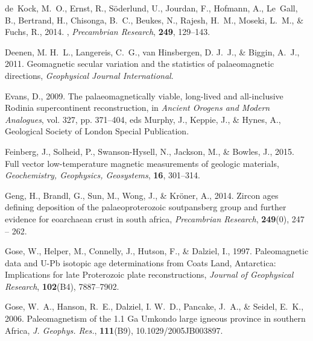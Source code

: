 \documentclass[11pt,letterpaper]{article}
\begin{document}
\begin{thebibliography}{49}
de~Kock, M.~O., Ernst, R., S{\"o}derlund, U., Jourdan, F., Hofmann, A.,
  Le~Gall, B., Bertrand, H., Chisonga, B.~C., Beukes, N., Rajesh, H.~M.,
  Moseki, L.~M., \& Fuchs, R., 2014.
, {\it Precambrian Research\/}, {\bf 249}, 129--143.

Deenen, M. H.~L., Langereis, C.~G., van Hinsbergen, D. J.~J., \& Biggin, A.~J.,
  2011.
\newblock Geomagnetic secular variation and the statistics of palaeomagnetic
  directions, {\it Geophysical Journal International\/}.

Evans, D., 2009.
\newblock The palaeomagnetically viable, long-lived and all-inclusive {R}odinia
  supercontinent reconstruction, in {\em Ancient Orogens and Modern
  Analogues\/}, vol. 327, pp. 371--404, eds Murphy, J., Keppie, J., \& Hynes,
  A., Geological Society of London Special Publication.

Feinberg, J., Solheid, P., Swanson-Hysell, N., Jackson, M., \& Bowles, J.,
  2015.
\newblock Full vector low-temperature magnetic measurements of geologic
  materials, {\it Geochemistry, Geophysics, Geosystems\/}, {\bf 16}, 301--314.

Geng, H., Brandl, G., Sun, M., Wong, J., \& Kr{\"o}ner, A., 2014.
\newblock Zircon ages defining deposition of the palaeoproterozoic soutpansberg
  group and further evidence for eoarchaean crust in south africa, {\it
  Precambrian Research\/}, {\bf 249}(0), 247 -- 262.

Gose, W., Helper, M., Connelly, J., Hutson, F., \& Dalziel, I., 1997.
\newblock Paleomagnetic data and {U-Pb} isotopic age determinations from
  {C}oats {L}and, {A}ntarctica: {I}mplications for late {P}roterozoic plate
  reconstructions, {\it Journal of Geophysical Research\/}, {\bf 102}(B4),
  7887--7902.

Gose, W.~A., Hanson, R.~E., Dalziel, I. W.~D., Pancake, J.~A., \& Seidel,
  E.~K., 2006.
\newblock Paleomagnetism of the {1.1 Ga Umkondo large igneous province in
  southern Africa}, {\it J. Geophys. Res.\/}, {\bf 111}(B9),
  10.1029/2005JB003897.


\end{thebibliography}
\end{document}
